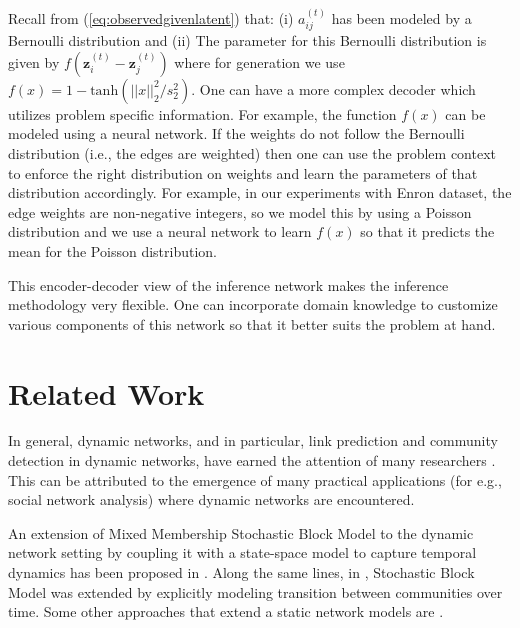 \documentclass[letterpaper]{article} %
\begin{document}
Recall from (\ref{eq:observedgivenlatent}) that: (i) ${a_{ij}^{(t)}}$ has been modeled by a Bernoulli distribution and (ii) The parameter for this Bernoulli distribution is given by $f(\mathbf{z}_i^{(t)} - \mathbf{z}_j^{(t)})$ where for generation we use $f(x) = 1 - \mathrm{tanh}(||x||_2^2/{s_2^2})$. One can have a more complex decoder which utilizes problem specific information. For example, the function $f(x)$ can be modeled using a neural network. If the weights do not follow the Bernoulli distribution (i.e., the edges are weighted) then one can use the problem context to enforce the right distribution on weights and learn the parameters of that distribution accordingly. For example, in our experiments with Enron dataset, the edge weights are non-negative integers, so we model this by using a Poisson distribution and we use a neural network to learn $f(x)$ so that it predicts the mean for the Poisson distribution.

This encoder-decoder view of the inference network makes the inference methodology very flexible. One can incorporate domain knowledge to customize various components of this network so that it better suits the problem at hand.


\section{Related Work}
\label{section:relatedwork}
In general, dynamic networks, and in particular, link prediction and community detection in dynamic networks, have earned the attention of many researchers \cite{GolderbergEtAl:2010:ASurveyOfStatisticalNetworkModels,KimEtAl:2017:AReviewOfDynamicNetworkModelsWithLatentVariables}. This can be attributed to the emergence of many practical applications (for e.g., social network analysis) where dynamic networks are encountered.

An extension of Mixed Membership Stochastic Block Model \cite{Airoldi:2008:MixedMembershipStochasticBlockmodels} to the dynamic network setting by coupling it with a state-space model to capture temporal dynamics has been proposed in \cite{XingEtAl:2010:AStateSpaceMixedMembershipBlockmodelForDynamicNetworkTomography,HoEtAl:2011:EvolvingClusterMixedMembershipBlockmodelforTimeVaryingNetworks}. Along the same lines, in \cite{YangEtAl:2011:DetectingCommunitiesAndTheirEvolutionsInDynamicSocialNetworksABayesianapproach}, Stochastic Block Model \cite{HollandEtAl:1983:StochasticBlockmodelsFirstSteps} was extended by explicitly modeling transition between communities over time. Some other approaches that extend a static network models are \cite{XuHero:2014:DynamicStochasticBlockmodelsForTimeEvolvingSocialNetworks,Xu:2015:StochasticBlockTransitionModelsForDynamicNetworks,PapadopoulosEtAl:2012:PopularityVsSimilarityInGrowingNetworks}.
\end{document}
